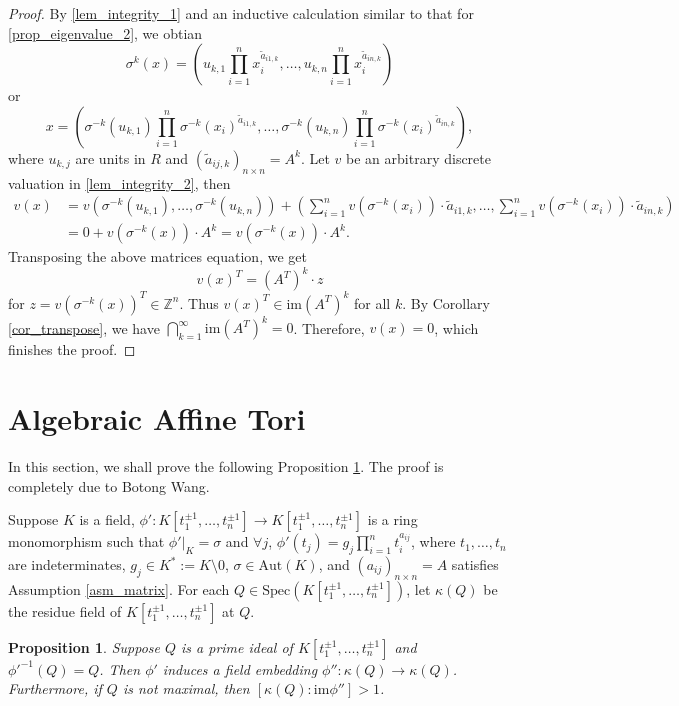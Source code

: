 \documentclass[12pt]{amsart}
\theoremstyle{plain}
\newtheorem{proposition}[theorem]{Proposition}
\theoremstyle{definition}
\theoremstyle{question}
\theoremstyle{remark}
\theoremstyle{assumption}
\numberwithin{equation}{section}
\theoremstyle{bigthm}
\begin{document}
\begin{proof}
By \eqref{lem_integrity_1} and an inductive calculation similar to that for \eqref{prop_eigenvalue_2}, we obtian
\[
\sigma^{k} (x) = \left( u_{k,1} \prod_{i=1}^{n} x_{i}^{\tilde{a}_{i1,k}}, \dots, u_{k,n} \prod_{i=1}^{n} x_{i}^{\tilde{a}_{in,k}} \right)
\]
or
\[
x = \left( \sigma^{-k} (u_{k,1}) \prod_{i=1}^{n} \sigma^{-k} (x_{i})^{\tilde{a}_{i1,k}}, \dots, \sigma^{-k} (u_{k,n}) \prod_{i=1}^{n} \sigma^{-k} (x_{i})^{\tilde{a}_{in,k}} \right),
\]
where $u_{k,j}$ are units in $R$ and $(\tilde{a}_{ij,k})_{n \times n} = A^{k}$. Let $v$ be an arbitrary discrete valuation in \eqref{lem_integrity_2}, then
\begin{align*}
v (x) & = v (\sigma^{-k} (u_{k,1}), \dots, \sigma^{-k} (u_{k,n})) + \left( \sum_{i=1}^{n} v(\sigma^{-k} (x_{i})) \cdot \tilde{a}_{i1,k}, \dots, \sum_{i=1}^{n} v(\sigma^{-k} (x_{i})) \cdot \tilde{a}_{in,k}  \right) \\
& =  0 + v (\sigma^{-k} (x)) \cdot A^{k} = v (\sigma^{-k} (x)) \cdot A^{k}.
\end{align*}
Transposing the above matrices equation, we get
\[
v(x)^{T} = (A^{T})^{k} \cdot z
\]
for $z = v (\sigma^{-k} (x))^{T} \in \mathbb{Z}^{n}$. Thus $v (x)^{T} \in \mathrm{im} (A^{T})^{k}$ for all $k$. By Corollary \ref{cor_transpose}, we have $\bigcap_{k=1}^{\infty} \mathrm{im} (A^{T})^{k} =0$. Therefore, $v (x) =0$, which finishes the proof.
\end{proof}

\section{Algebraic Affine Tori}\label{sec_algebra_tori}
In this section, we shall prove the following Proposition \ref{prop_degree}. The proof is completely due to Botong Wang.

Suppose $K$ is a field, $\phi' \colon  K[t_{1}^{\pm 1}, \dots, t_{n}^{\pm 1}] \rightarrow K[t_{1}^{\pm 1}, \dots, t_{n}^{\pm 1}]$ is a ring monomorphism such that $\phi'|_{K} = \sigma$ and $\forall j$, $\phi'(t_{j}) = g_{j} \prod_{i=1}^{n} t_{i}^{a_{ij}}$, where $t_{1}, \dots, t_{n}$ are indeterminates, $g_{j} \in K^{*} := K \setminus 0$, $\sigma \in \mathrm{Aut}(K)$, and $(a_{ij})_{n \times n} = A$ satisfies Assumption \ref{asm_matrix}. For each $Q \in \mathrm{Spec} (K[t_{1}^{\pm 1}, \dots, t_{n}^{\pm 1}])$, let $\kappa (Q)$ be the residue field of $K[t_{1}^{\pm 1}, \dots, t_{n}^{\pm 1}]$ at $Q$.
\begin{proposition}\label{prop_degree}
Suppose $Q$ is a prime ideal of $K[t_{1}^{\pm 1}, \dots, t_{n}^{\pm 1}]$ and ${\phi'}^{-1} (Q) = Q$. Then $\phi'$ induces a field embedding $\phi'' \colon  \kappa (Q) \rightarrow \kappa (Q)$. Furthermore, if $Q$ is not maximal, then $[\kappa (Q): \mathrm{im} \phi''] >1$.
\end{proposition}
\end{document}
